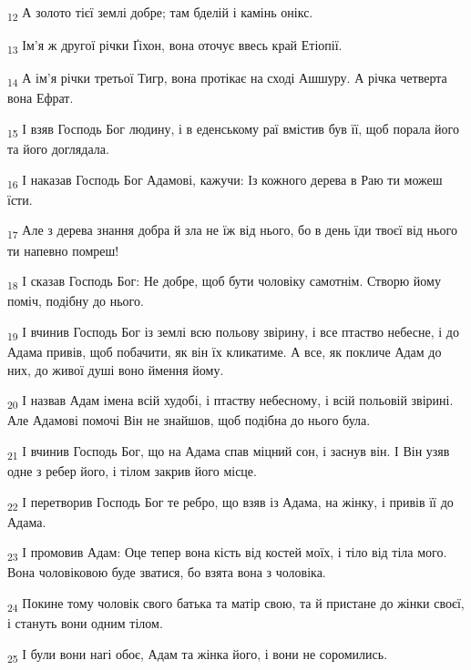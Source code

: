 \begin{tcolorbox}
\textsubscript{12} А золото тієї землі добре; там бделій і камінь онікс.
\end{tcolorbox}
\begin{tcolorbox}
\textsubscript{13} Ім'я ж другої річки Ґіхон, вона оточує ввесь край Етіопії.
\end{tcolorbox}
\begin{tcolorbox}
\textsubscript{14} А ім'я річки третьої Тигр, вона протікає на сході Ашшуру. А річка четверта вона Ефрат.
\end{tcolorbox}
\begin{tcolorbox}
\textsubscript{15} І взяв Господь Бог людину, і в еденському раї вмістив був її, щоб порала його та його доглядала.
\end{tcolorbox}
\begin{tcolorbox}
\textsubscript{16} І наказав Господь Бог Адамові, кажучи: Із кожного дерева в Раю ти можеш їсти.
\end{tcolorbox}
\begin{tcolorbox}
\textsubscript{17} Але з дерева знання добра й зла не їж від нього, бо в день їди твоєї від нього ти напевно помреш!
\end{tcolorbox}
\begin{tcolorbox}
\textsubscript{18} І сказав Господь Бог: Не добре, щоб бути чоловіку самотнім. Створю йому поміч, подібну до нього.
\end{tcolorbox}
\begin{tcolorbox}
\textsubscript{19} І вчинив Господь Бог із землі всю польову звірину, і все птаство небесне, і до Адама привів, щоб побачити, як він їх кликатиме. А все, як покличе Адам до них, до живої душі воно ймення йому.
\end{tcolorbox}
\begin{tcolorbox}
\textsubscript{20} І назвав Адам імена всій худобі, і птаству небесному, і всій польовій звірині. Але Адамові помочі Він не знайшов, щоб подібна до нього була.
\end{tcolorbox}
\begin{tcolorbox}
\textsubscript{21} І вчинив Господь Бог, що на Адама спав міцний сон, і заснув він. І Він узяв одне з ребер його, і тілом закрив його місце.
\end{tcolorbox}
\begin{tcolorbox}
\textsubscript{22} І перетворив Господь Бог те ребро, що взяв із Адама, на жінку, і привів її до Адама.
\end{tcolorbox}
\begin{tcolorbox}
\textsubscript{23} І промовив Адам: Оце тепер вона кість від костей моїх, і тіло від тіла мого. Вона чоловіковою буде зватися, бо взята вона з чоловіка.
\end{tcolorbox}
\begin{tcolorbox}
\textsubscript{24} Покине тому чоловік свого батька та матір свою, та й пристане до жінки своєї, і стануть вони одним тілом.
\end{tcolorbox}
\begin{tcolorbox}
\textsubscript{25} І були вони нагі обоє, Адам та жінка його, і вони не соромились.
\end{tcolorbox}
